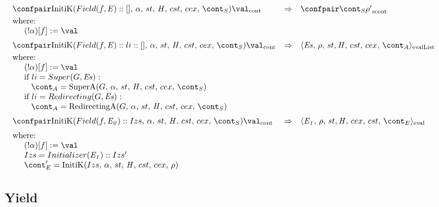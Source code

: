 \documentclass{article}
\begin{document}
\[
  \begin{array}{lcl@{\hspace{30mm}}}
	\contconf{\InitK{Field(f, \expr) :: []}{\loc}{\scont}}{\val}
	& \Rightarrow &
	\scontconf{\scont}{\env'}\\[1mm]
	\textrm{where:}\\
	\hspace{5mm}\update{(\deref{\loc})[f]}{\val}\\[2mm]

	\contconf{\InitK{Field(f, \expr) :: li :: []}{\loc}{\scont}}{\val}
	& \Rightarrow &
	\evallistconf{\exprs}{\env}{\strace}{\cstrace}{\cex}{\acont}\\[1mm]
	\textrm{where:}\\
	\hspace{5mm}\update{(\deref{\loc})[f]}{\val}\\
	\hspace{5mm}\textrm{if } li = Super(G, \exprs):\\
	\hspace{8mm}\acont = \SuperA{G}{\loc}{\scont}\\
	\hspace{5mm}\textrm{if } li = Redirecting(G, \exprs):\\
	\hspace{8mm}\acont = \RedirectingA{G}{\loc}{\scont}\\[2mm]

	\contconf{\InitK{Field(f, \expri{0}) :: Izs}{\loc}{\scont}}{\val}
	& \Rightarrow &
	\evalconf{\expri{1}}{\env}{st}{cex}{cst}{\econt}\\[2mm]
	\textrm{where:}\\
	\hspace{5mm}\update{(\deref\loc)[f]}{\val}\\
	\hspace{5mm}Izs = Initializer(\expri{1}) :: Izs'\\
	\hspace{5mm}\econt' = \InitK{Izs}{\loc}{\env}
  \end{array}
\]

\subsection{Yield}
\end{document}
